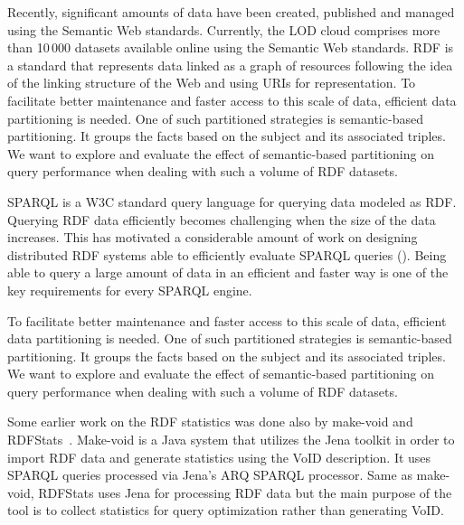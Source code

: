 Recently, significant amounts of data have been created, published and managed using the Semantic Web standards.
Currently, the \gls{LOD} cloud comprises more than 10\,000 datasets available online using the Semantic Web standards. 
\gls{RDF} is a standard that represents data linked as a graph of resources following the idea of the linking structure of the Web and using \gls{URI}s for representation.
To facilitate better maintenance and faster access to this scale of data, efficient data partitioning is needed.
One of such partitioned strategies is semantic-based partitioning. 
It groups the facts based on the subject and its associated triples.
We want to explore and evaluate the effect of semantic-based partitioning on query performance when dealing with such a volume of \gls{RDF} datasets.

\gls{SPARQL} is a \gls{W3C} standard query language for querying data modeled as \gls{RDF}.
Querying \gls{RDF} data efficiently becomes challenging when the size of the data increases.
This has motivated a considerable amount of work on designing distributed \gls{RDF} systems able to efficiently evaluate \gls{SPARQL} queries (\cite{Schatzle:2016:SRQ:2977797.2977806,sparqlgx-iswc-2016}).
Being able to query a large amount of data in an efficient and faster way is one of the key requirements for every \gls{SPARQL} engine.


To facilitate better maintenance and faster access to this scale of data, efficient data partitioning is needed.
One of such partitioned strategies is semantic-based partitioning. 
It groups the facts based on the subject and its associated triples.
We want to explore and evaluate the effect of semantic-based partitioning on query performance when dealing with such a volume of \gls{RDF} datasets.



Some earlier work on the \gls{RDF} statistics was done also by make-void and RDFStats~\cite{conf/dexaw/LangeggerW09}.
Make-void is a Java system that utilizes the Jena toolkit in order to import \gls{RDF} data and generate statistics using the VoID description. 
It uses \gls{SPARQL} queries processed via Jena's ARQ \gls{SPARQL} processor.
Same as make-void, RDFStats uses Jena for processing \gls{RDF} data but the main purpose of the tool is to collect statistics for query optimization rather than generating VoID.